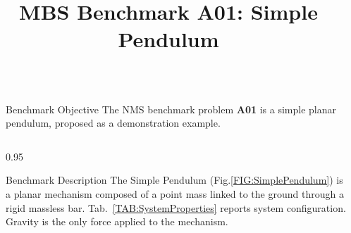 \documentclass[final]{beamer}
\title{MBS Benchmark A01: Simple Pendulum} %
\newlength{\sepwid}
\newlength{\onecolwid}
\newlength{\twocolwid}
\begin{document}

\setlength{\belowcaptionskip}{2ex} %
\setlength\belowdisplayshortskip{2ex} %

\begin{frame}[t] %

\begin{columns}[t] %

\begin{column}{\sepwid}\end{column} %

\begin{column}{\twocolwid} %


\begin{alertblock}{Benchmark Objective}
The NMS benchmark problem \textbf{A01} is a simple planar pendulum, proposed as a demonstration example.
\end{alertblock}





\begin{columns}[t, totalwidth=\twocolwid]

\begin{column}{0.95\onecolwid}
\begin{block}{Benchmark Description}
The Simple Pendulum (Fig.\ref{FIG:SimplePendulum}) is a planar mechanism composed of a point mass linked to the ground through a rigid massless bar. Tab.~\ref{TAB:SystemProperties} reports system configuration. Gravity is the only force applied to the mechanism.


\end{block}



\end{column}
\end{columns}
\end{column}
\end{columns}
\end{frame}
\end{document}
